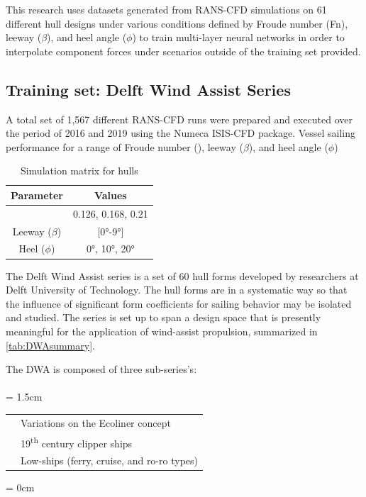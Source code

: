 \documentclass[twoside,twocolumn]{article}
\begin{document}
This research uses datasets generated from RANS-CFD simulations on 61 different hull designs under various conditions defined by Froude number (Fn), leeway ($\beta$), and heel angle ($\phi$) to train multi-layer neural networks in order to interpolate component forces under scenarios outside of the training set provided. 


\subsection{Training set: Delft Wind Assist Series}

A total set of 1,567 different RANS-CFD runs were prepared and executed over the period of 2016 and 2019 using the Numeca ISIS-CFD package. Vessel sailing performance for a range of Froude number (\Fn), leeway ($\beta$), and heel angle ($\phi$)

\begin{table}[]
	\caption{Simulation matrix for \DWA hulls}
	\label{tab:parameters}
	\begin{tabular}{@{}cc@{}}
		\toprule
		\textbf{Parameter} & \textbf{Values} \\ \midrule
		\Fn & 0.126, 0.168, 0.21 \\
		Leeway ($\beta$) & [\ang{0}-\ang{9}] \\
		Heel ($\phi$) & \ang{0}, \ang{10}, \ang{20} \\ \bottomrule
	\end{tabular}
\end{table}

The Delft Wind Assist series is a set of 60 hull forms developed by researchers at Delft University of Technology. The hull forms are  in a systematic way so that the influence of significant form coefficients for sailing behavior may be isolated and studied. The series is set up to span a design space that is presently meaningful for the application of wind-assist propulsion, summarized in \cref{tab:DWAsummary}.

The DWA is composed of three sub-series's: \\
\\ 
\leftskip = 1.5cm
\begin{tabular}[!th]{p{1.5cm}p{4cm}}
	\firstseries & Variations on the Ecoliner concept \cite{Ecoliner} \\
	\secondseries &  19\textsuperscript{th} century clipper ships \\ 
	\thirdseries & Low-\Cp \space ships (ferry, cruise, and ro-ro types) \\ 
\end{tabular}
\leftskip = 0cm
\end{document}
